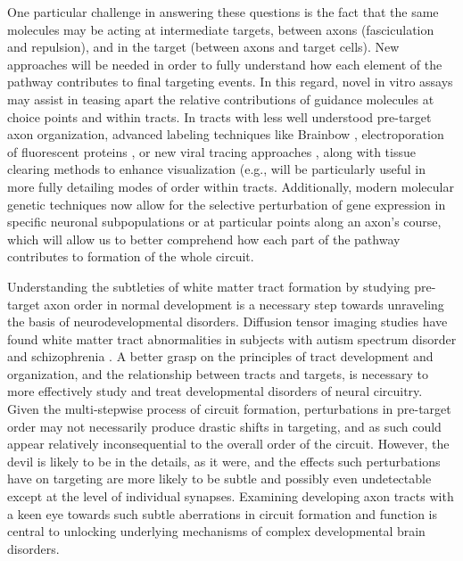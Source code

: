 One particular challenge in answering these questions is the fact that the same molecules may be acting at intermediate targets, between axons (fasciculation and repulsion), and in the target (between axons and target cells).
New approaches will be needed in order to fully understand how each element of the pathway contributes to final targeting events.
In this regard, novel in vitro assays may assist in teasing apart the relative contributions of guidance molecules at choice points and within tracts.
In tracts with less well understood pre-target axon organization, advanced labeling techniques like Brainbow \cite{lu2009interscutularis}, electroporation of fluorescent proteins \cite{saito2001efficient}, or new viral tracing approaches \cite{reardon2016rabies}, along with tissue clearing methods to enhance visualization (e.g., \cite{erturk2012three,kuwajima2013cleart,tomer2014advanced} will be particularly useful in more fully detailing modes of order within tracts.
Additionally, modern molecular genetic techniques now allow for the selective perturbation of gene expression in specific neuronal subpopulations or at particular points along an axon’s course, which will allow us to better comprehend how each part of the pathway contributes to formation of the whole circuit.

Understanding the subtleties of white matter tract formation by studying pre-target axon order in normal development is a necessary step towards unraveling the basis of neurodevelopmental disorders.
Diffusion tensor imaging studies have found white matter tract abnormalities in subjects with autism spectrum disorder \cite{wolff2012differences} and schizophrenia \cite{kubicki2007review}.
A better grasp on the principles of tract development and organization, and the relationship between tracts and targets, is necessary to more effectively study and treat developmental disorders of neural circuitry.
Given the multi-stepwise process of circuit formation, perturbations in pre-target order may not necessarily produce drastic shifts in targeting, and as such could appear relatively inconsequential to the overall order of the circuit.
However, the devil is likely to be in the details, as it were, and the effects such perturbations have on targeting are more likely to be subtle and possibly even undetectable except at the level of individual synapses.
Examining developing axon tracts with a keen eye towards such subtle aberrations in circuit formation and function is central to unlocking underlying mechanisms of complex developmental brain disorders.
